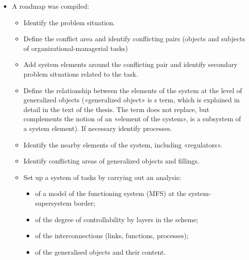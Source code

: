 \documentclass[11pt,a4paper]{book}
\begin{document}
\begin{itemize}
\item A roadmap was compiled:
  \begin{itemize}
  \item Identify the problem situation.
  \item Define the conflict area and identify conflicting pairs (objects and
    subjects of organizational-managerial tasks)
  \item Add system elements around the conflicting pair and identify secondary
    problem situations related to the task.
  \item Define the relationship between the elements of the system at the
    level of generalized objects («generalized object» is s term, which is
    explained in detail in the text of the thesis. The term does not replace,
    but complements the notion of an «element of the system», is a subsystem
    of a system element). If necessary identify processes.
  \item Identify the nearby elements of the system, including «regulators».
  \item Identify conflicting areas of generalized objects and fillings.
  \item Set up a system of tasks by carrying out an analysis:
    \begin{itemize}
      \item of a model of the functioning system (MFS) at the
        system-supersystem border;
      \item of the degree of controllability by layers in the scheme;
      \item of the interconnections (links, functions, processes);
      \item of the generalised objects and their content.
    \end{itemize}
  \end{itemize}


\end{itemize}
\end{document}
